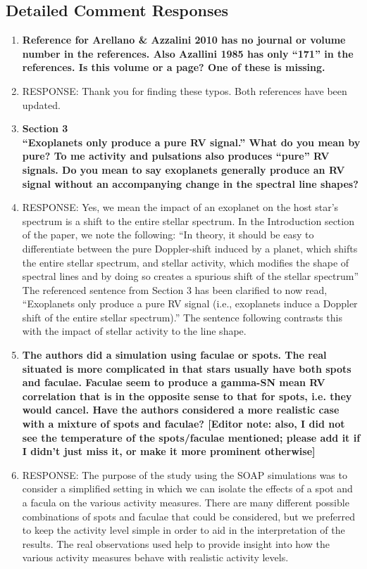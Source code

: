 \documentclass[11pt]{article}   	%
\begin{document}
\bigskip


\subsection{Detailed Comment Responses}

\begin{enumerate}
\item {\bf Reference for Arellano \& Azzalini 2010 has no journal or volume number in the references. Also Azallini 1985 has only ``171'' in the references. Is this volume or a page? One of these is missing.}
%
\item[]  RESPONSE:  Thank you for finding these typos.  Both references have been updated.
\bigskip
%
%
\item {\bf Section 3 \\
``Exoplanets only produce a pure RV signal.'' What do you mean by pure? To me activity and pulsations also produces ``pure'' RV signals. Do you mean to say exoplanets generally produce an RV signal without an accompanying change in the spectral line shapes?}
%
\item[]  RESPONSE:  Yes, we mean the impact of an exoplanet on the host star's spectrum is a shift to the entire stellar spectrum.  In the Introduction section of the paper, we note the following:  ``In theory, it should be easy to differentiate between the pure Doppler-shift induced by a planet, which shifts the entire stellar spectrum, and stellar activity, which modifies the shape of spectral lines and by doing so creates a spurious shift of the stellar spectrum''  The referenced sentence from Section 3 has been clarified to now read, ``Exoplanets only produce a pure RV signal (i.e., exoplanets induce a Doppler shift of the entire stellar spectrum).''  The sentence following contrasts this with the impact of stellar activity to the line shape.
\bigskip
%
%
\item {\bf The authors did a simulation using faculae or spots. The real situated is more complicated in that stars usually have both spots and faculae. Faculae seem to produce a gamma-SN mean RV correlation that is in the opposite sense to that for spots, i.e. they would cancel. Have the authors considered a more realistic case with a mixture of spots and faculae? [Editor note: also, I did not see the temperature of the spots/faculae mentioned; please add it if I didn't just miss it, or make it more prominent otherwise]}
%
\item[]  RESPONSE:  The purpose of the study using the SOAP simulations was to consider a simplified setting in which we can isolate the effects of a spot and a facula on the various activity measures.  There are many different possible combinations of spots and faculae that could be considered, but we preferred to keep the activity level simple in order to aid in the interpretation of the results.  The real observations used help to provide insight into how the various activity measures behave with realistic activity levels.  


\end{enumerate}
\end{document}
